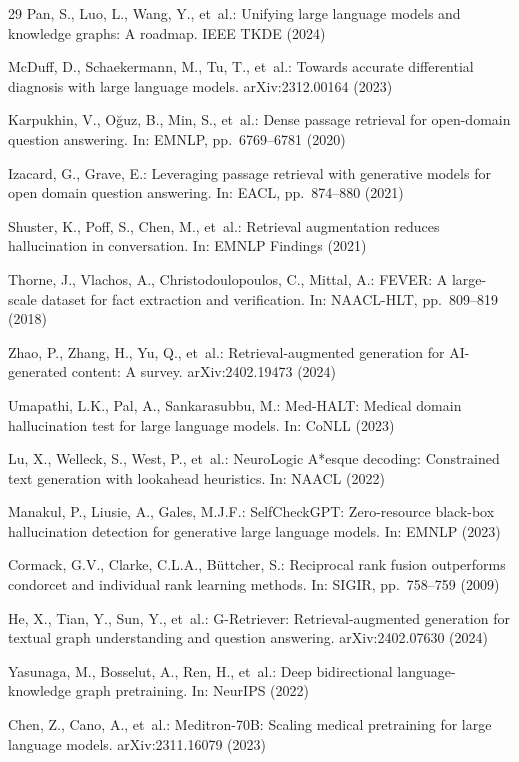 \documentclass[runningheads]{llncs}
\begin{document}
\begin{thebibliography}{29}
Pan, S., Luo, L., Wang, Y., et~al.: Unifying large language models and knowledge graphs: A roadmap. IEEE TKDE (2024)

McDuff, D., Schaekermann, M., Tu, T., et~al.: Towards accurate differential diagnosis with large language models. arXiv:2312.00164 (2023)

Karpukhin, V., O\u{g}uz, B., Min, S., et~al.: Dense passage retrieval for open-domain question answering. In: EMNLP, pp.~6769--6781 (2020)

Izacard, G., Grave, E.: Leveraging passage retrieval with generative models for open domain question answering. In: EACL, pp.~874--880 (2021)

Shuster, K., Poff, S., Chen, M., et~al.: Retrieval augmentation reduces hallucination in conversation. In: EMNLP Findings (2021)

Thorne, J., Vlachos, A., Christodoulopoulos, C., Mittal, A.: FEVER: A large-scale dataset for fact extraction and verification. In: NAACL-HLT, pp.~809--819 (2018)

Zhao, P., Zhang, H., Yu, Q., et~al.: Retrieval-augmented generation for AI-generated content: A survey. arXiv:2402.19473 (2024)

Umapathi, L.K., Pal, A., Sankarasubbu, M.: Med-HALT: Medical domain hallucination test for large language models. In: CoNLL (2023)

Lu, X., Welleck, S., West, P., et~al.: NeuroLogic A*esque decoding: Constrained text generation with lookahead heuristics. In: NAACL (2022)

Manakul, P., Liusie, A., Gales, M.J.F.: SelfCheckGPT: Zero-resource black-box hallucination detection for generative large language models. In: EMNLP (2023)

Cormack, G.V., Clarke, C.L.A., B\"uttcher, S.: Reciprocal rank fusion outperforms condorcet and individual rank learning methods. In: SIGIR, pp.~758--759 (2009)

He, X., Tian, Y., Sun, Y., et~al.: G-Retriever: Retrieval-augmented generation for textual graph understanding and question answering. arXiv:2402.07630 (2024)

Yasunaga, M., Bosselut, A., Ren, H., et~al.: Deep bidirectional language-knowledge graph pretraining. In: NeurIPS (2022)

Chen, Z., Cano, A., et~al.: Meditron-70B: Scaling medical pretraining for large language models. arXiv:2311.16079 (2023)

\end{thebibliography}
\end{document}
